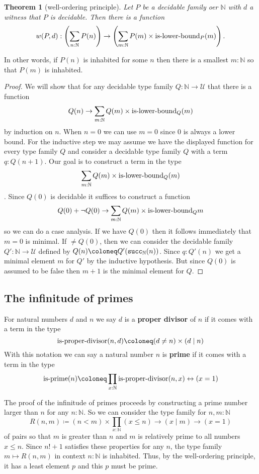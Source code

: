 \documentclass{amsart}
\theoremstyle{theorem}
\newtheorem*{thm}{Theorem}
\theoremstyle{definition}
\theoremstyle{remark}
\newcommand{\0}{\mathbbe{0}}
\newcommand{\1}{\mathbbe{1}}
\newcommand{\2}{\mathbbe{2}}
\newcommand{\3}{\mathbbe{3}}
\newcommand{\4}{\mathbbe{4}}
\newcommand{\term}[1]{{\textup{\texttt{#1}}}}
\newcommand{\type}[1]{{\textup{#1}}}
\newcommand{\bN}{{\mathbb{N}}}
\newcommand{\suc}{\term{succ}_{\bN}}
\newcommand{\UU}{{\mathcal{U}}}
\begin{document}
  \begin{thm}[well-ordering principle]
    Let $P$ be a decidable family oer $\bN$ with $d$ a witness that $P$ is decidable. Then there is a function
    \[ w(P,d) : \left( \sum_{n : \bN}P(n)\right) \to \left( \sum_{m : \bN}P(m) \times \type{is-lower-bound}_P(m)\right).\]
  \end{thm}
  In other words, if $P(n)$ is inhabited for some $n$ then there is a smallest $m : \bN$ so that $P(m)$ is inhabited.

  \begin{proof}
    We will show that for any decidable type family $Q : \bN \to \UU$ that there is a function
    \[ Q(n) \to \sum_{m : \bN}Q(m) \times \type{is-lower-bound}_Q(m)
    \]
    by induction on $n$. When $n=0$ we can use $m=0$ since 0 is always a lower bound. For the inductive step we may assume we have the displayed function for every type family $Q$ and consider a decidable type family $Q$ with a term $q : Q(n+1)$. Our goal is to construct a term in the type
    \[ \sum_{m : \bN}Q(m) \times \type{is-lower-bound}_{Q}(m)\]. Since $Q(0)$ is decidable it suffices to construct a function
    \[ Q(0) + \neg Q(0) \to  \sum_{m : \bN}Q(m) \times \type{is-lower-bound}_{Q}m
    \]
    so we can do a case analysis. If we have $Q(0)$ then it follows immediately that $m=0$ is minimal.  If $\neq Q(0)$, then we can consider the decidable family $Q' \colon \bN \to \UU$ defined by $Q(n) \coloneq Q'(\suc(n))$. Since $q : Q'(n)$ we get a minimal element $m$ for $Q'$ by the inductive hypothesis. But since $Q(0)$ is assumed to be false then $m+1$ is the minimal element for $Q$.   
    \end{proof}
    
  

\subsection*{The infinitude of primes}  

For natural numbers $d$ and $n$ we say $d$ is a \textbf{proper divisor} of $n$ if it comes with a term in the type
\[ \type{is-proper-divisor}(n,d) \coloneq (d \neq n) \times (d \mid n)\]
With this notation we can say a natural number $n$ is \textbf{prime} if it comes with a term in the type
\[ \type{is-prime}(n) \coloneq \prod_{x : \bN}\type{is-proper-divisor}(n,x) \leftrightarrow (x=1)\]

The proof of the infinitude of primes proceeds by constructing a prime number larger than $n$ for any $n : \bN$. So we can consider the type family for $n,m : \bN$
\[ R(n,m) \coloneq (n < m) \times \prod_{x : \bN} (x \leq n) \to (x \mid m) \to (x=1)\]
of pairs so that $m$ is greater than $n$ and $m$ is relatively prime to all numbers $x \leq n$. Since $n!+1$ satisfies these properties for any $n$, the type family $m \mapsto R(n,m)$ in context $n : \bN$ is inhabited. Thus, by the well-ordering principle, it has a least element $p$ and this $p$ must be prime.
\end{document}
